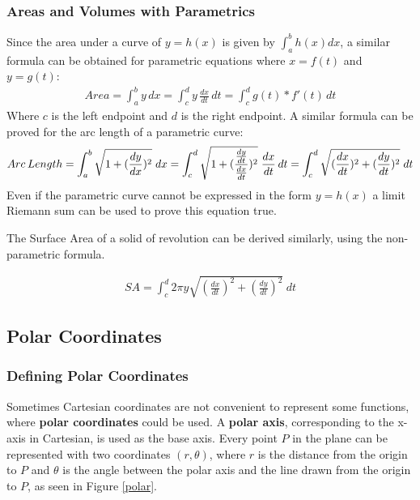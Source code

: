 \documentclass{article}
\begin{document}
\subsubsection{Areas and Volumes with Parametrics}
Since the area under a curve of $y = h(x)$ is given by $\int_a^b h(x) dx$, a similar formula can be obtained for parametric equations where $x=f(t)$ and $y=g(t)$:
\begin{gather*}
    Area = \int_a^b y\hspace{2pt}dx = \int_c^d y \hspace{2pt} \frac{dx}{dt} \hspace{2pt}dt = \int_c^d g(t) * f'(t) \hspace{2pt} dt
\end{gather*}
Where $c$ is the left endpoint and $d$ is the right endpoint.
\linebreak\linebreak
A similar formula can be proved for the arc length of a parametric curve:
\begin{gather*}
    Arc\hspace{2pt}Length = \int_a^b \sqrt{1+(\frac{dy}{dx})^2} \hspace{3pt}dx
    = \int_c^d \sqrt{1+(\frac{\frac{dy}{dt}}{\frac{dx}{dt}})^2} \hspace{3pt} \frac{dx}{dt} \hspace{2pt} dt
    \linebreak\linebreak
    = \int_c^d \sqrt{(\frac{dx}{dt})^2 + (\frac{dy}{dt})^2} \hspace{3pt} dt
\end{gather*}
Even if the parametric curve cannot be expressed in the form $y=h(x)$ a limit Riemann sum can be used to prove this equation true.

The Surface Area of a solid of revolution can be derived similarly, using the non-parametric formula.

\begin{gather*}
    SA = \int_c^d 2\pi y \sqrt{(\frac{dx}{dt})^2 + (\frac{dy}{dt})^2} \hspace{3pt} dt
\end{gather*}
\subsection{Polar Coordinates}
\subsubsection{Defining Polar Coordinates}
Sometimes Cartesian coordinates are not convenient to represent some functions, where \textbf{polar coordinates} could be used. A \textbf{polar axis}, corresponding to the x-axis in Cartesian, is used as the base axis. Every point $P$ in the plane can be represented with two coordinates $(r,\theta)$, where $r$ is the distance from the origin to $P$ and $\theta$ is the angle between the polar axis and the line drawn from the origin to $P$, as seen in Figure \ref{polar}.
\end{document}
